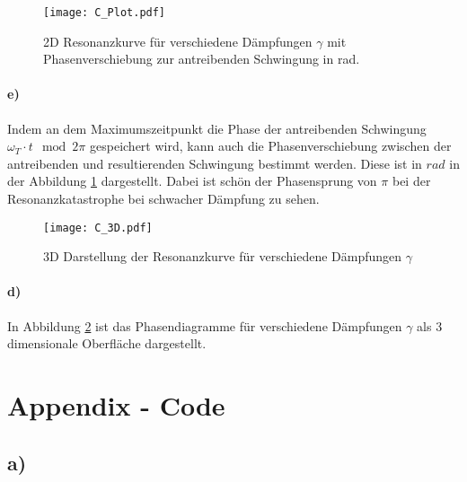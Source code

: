 \smallskip

\begin{figure}[p]
	\centering
	\texttt{[image: C\_Plot.pdf]}
	\caption{2D Resonanzkurve für verschiedene Dämpfungen $\gamma$ mit Phasenverschiebung zur antreibenden Schwingung in \si{\radian}.}
	\label{fig:plot}
\end{figure}
\paragraph*{e)} Indem an dem Maximumszeitpunkt die Phase der antreibenden Schwingung $\omega_T \cdot t \mod 2\pi$ gespeichert wird, kann auch die Phasenverschiebung zwischen der antreibenden und resultierenden Schwingung bestimmt werden.
Diese ist in $rad$ in der Abbildung \ref{fig:plot} dargestellt.
Dabei ist schön der Phasensprung von $\pi$ bei der Resonanzkatastrophe bei schwacher Dämpfung zu sehen.

\begin{figure}[p]
	\centering
	\texttt{[image: C\_3D.pdf]}
	\caption{3D Darstellung der Resonanzkurve für verschiedene Dämpfungen $\gamma$}
	\label{fig:3d}
\end{figure}
\paragraph*{d)}
In Abbildung \ref{fig:3d} ist das Phasendiagramme für verschiedene Dämpfungen $\gamma$ als 3 dimensionale Oberfläche dargestellt.

\clearpage
\section*{Appendix - Code}
\subsection*{a)}








